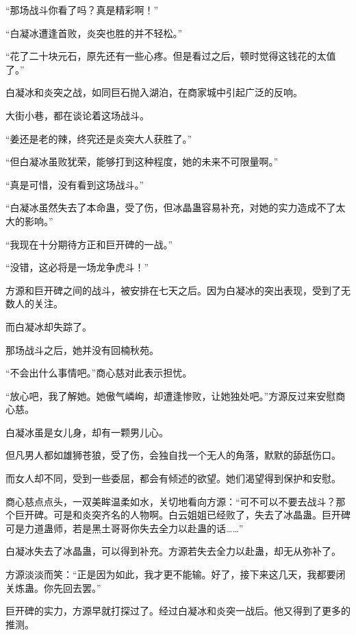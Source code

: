 
\begin{this_body}



“那场战斗你看了吗？真是精彩啊！”

“白凝冰遭逢首败，炎突也胜的并不轻松。”

“花了二十块元石，原先还有一些心疼。但是看过之后，顿时觉得这钱花的太值了。”

白凝冰和炎突之战，如同巨石抛入湖泊，在商家城中引起广泛的反响。

大街小巷，都在谈论着这场战斗。

“姜还是老的辣，终究还是炎突大人获胜了。”

“但白凝冰虽败犹荣，能够打到这种程度，她的未来不可限量啊。”

“真是可惜，没有看到这场战斗。”

“白凝冰虽然失去了本命蛊，受了伤，但冰晶蛊容易补充，对她的实力造成不了太大的影响。”

“我现在十分期待方正和巨开碑的一战。”

“没错，这必将是一场龙争虎斗！”

方源和巨开碑之间的战斗，被安排在七天之后。因为白凝冰的突出表现，受到了无数人的关注。

而白凝冰却失踪了。

那场战斗之后，她并没有回楠秋苑。

“不会出什么事情吧。”商心慈对此表示担忧。

“放心吧，我了解她。她傲气嶙峋，却遭逢惨败，让她独处吧。”方源反过来安慰商心慈。

白凝冰虽是女儿身，却有一颗男儿心。

但凡男人都如雄狮苍狼，受了伤，会独自找一个无人的角落，默默的舔舐伤口。

而女人却不同，受到一些委屈，都会有倾述的欲望。她们渴望得到保护和安慰。

商心慈点点头，一双美眸温柔如水，关切地看向方源：“可不可以不要去战斗？那个巨开碑。可是和炎突齐名的人物啊。白云姐姐已经败了，失去了冰晶蛊。巨开碑可是力道蛊师，若是黑土哥哥你失去全力以赴蛊的话……”

白凝冰失去了冰晶蛊，可以得到补充。方源若失去全力以赴蛊，却无从弥补了。

方源淡淡而笑：“正是因为如此，我才更不能输。好了，接下来这几天，我都要闭关炼蛊。你先回去罢。”

巨开碑的实力，方源早就打探过了。经过白凝冰和炎突一战后。他又得到了更多的推测。


\end{this_body}
